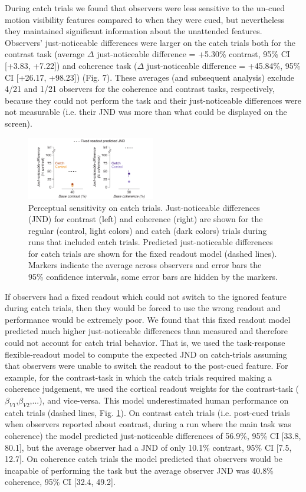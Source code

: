 \documentclass{report}
\begin{document}
During catch trials we found that observers were less sensitive to the un-cued motion visibility features compared to when they were cued, but nevertheless they maintained significant information about the unattended features. Observers’ just-noticeable differences were larger on the catch trials both for the contrast task (average $\Delta$ just-noticeable difference = +5.30\% contrast, 95\% CI [+3.83, +7.22]) and coherence task ($\Delta$ just-noticeable difference = +45.84\%, 95\% CI [+26.17, +98.23]) (Fig. 7). These averages (and subsequent analysis) exclude 4/21 and 1/21 observers for the coherence and contrast tasks, respectively, because they could not perform the task and their just-noticeable differences were not measurable (i.e. their JND was more than what could be displayed on the screen). 

\begin{figure}
\centering
\includegraphics[keepaspectratio,width=0.5\textwidth]{figs_c2/Fig8_catch.pdf}
\caption[Perceptual sensitivity on catch trials]{Perceptual sensitivity on catch trials. Just-noticeable differences (JND) for contrast (left) and coherence (right) are shown for the regular (control, light colors) and catch (dark colors) trials during runs that included catch trials. Predicted just-noticeable differences for catch trials are shown for the fixed readout model (dashed lines). Markers indicate the average across observers and error bars the 95\% confidence intervals, some error bars are hidden by the markers. }
\label{fig:c4f8}
\end{figure}

If observers had a fixed readout which could not switch to the ignored feature during catch trials, then they would be forced to use the wrong readout and performance would be extremely poor. We found that this fixed readout model predicted much higher just-noticeable differences than measured and therefore could not account for catch trial behavior. That is, we used the task-response flexible-readout model to compute the expected JND on catch-trials assuming that observers were unable to switch the readout to the post-cued feature. For example, for the contrast-task in which the catch trials required making a coherence judgement, we used the cortical readout weights for the contrast-task ($\beta_{V1}$,$\beta_{V2}$,...), and vice-versa. This model underestimated human performance on catch trials (dashed lines, Fig. \ref{fig:c4f8}). On contrast catch trials (i.e. post-cued trials when observers reported about contrast, during a run where the main task was coherence) the model predicted just-noticeable differences of 56.9\%, 95\% CI [33.8, 80.1], but the average observer had a JND of only 10.1\% contrast, 95\% CI [7.5, 12.7]. On coherence catch trials the model predicted that observers would be incapable of performing the task but the average observer JND was 40.8\% coherence, 95\% CI [32.4, 49.2]. 
\end{document}
